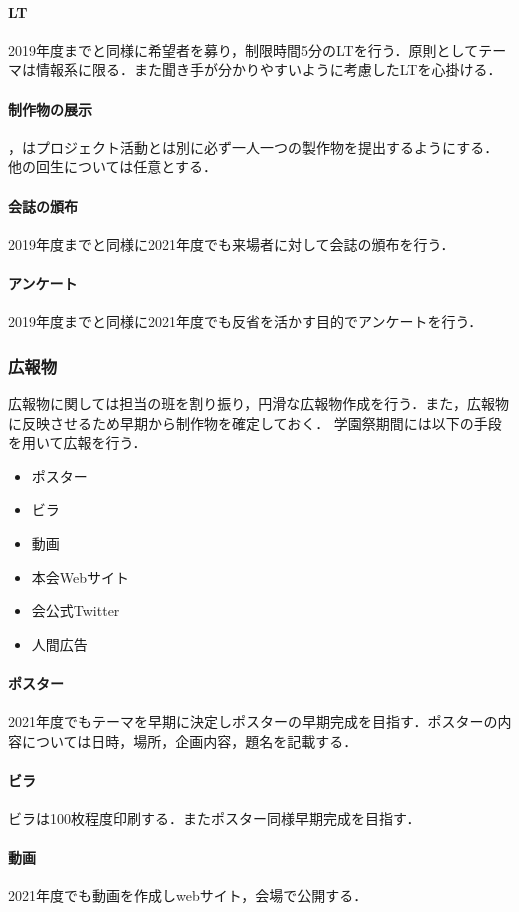 \paragraph{LT}
2019年度までと同様に希望者を募り，制限時間5分のLTを行う．原則としてテーマは情報系に限る．また聞き手が分かりやすいように考慮したLTを心掛ける．
\paragraph{制作物の展示}
\secondGrade{}，\thirdGrade{}はプロジェクト活動とは別に必ず一人一つの製作物を提出するようにする．他の回生については任意とする．
\paragraph{会誌の頒布}
2019年度までと同様に2021年度でも来場者に対して会誌の頒布を行う．
\paragraph{アンケート}
2019年度までと同様に2021年度でも反省を活かす目的でアンケートを行う．
\subsubsection*{広報物}
広報物に関しては担当の班を割り振り，円滑な広報物作成を行う．また，広報物に反映させるため早期から制作物を確定しておく．
学園祭期間には以下の手段を用いて広報を行う．
\begin{itemize}
    \item ポスター
    \item ビラ
    \item 動画
    \item 本会Webサイト
    \item 会公式Twitter
    \item 人間広告
\end{itemize}
\paragraph{ポスター}
2021年度でもテーマを早期に決定しポスターの早期完成を目指す．ポスターの内容については日時，場所，企画内容，題名を記載する．
\paragraph{ビラ}
ビラは100枚程度印刷する．またポスター同様早期完成を目指す．
\paragraph{動画}
2021年度でも動画を作成しwebサイト，会場で公開する．
